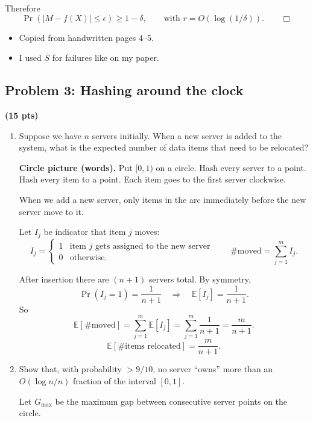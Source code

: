 \documentclass[10pt]{article}
\newcommand{\spara}[1]{\vspace{.5em}\noindent {\large\sffamily\textcolor{nyuOfficialPurple}{#1}}}
\newcommand{\E}{\mathbb{E}}
\begin{document}
Therefore
\[
\Pr(|M-f(X)|\le \epsilon)\ge 1-\delta,
\qquad
\text{with } r=O(\log(1/\delta)).
\qquad \Box
\]

\spara{Notes for Problem 2}
\begin{itemize}
\item Copied from handwritten pages 4--5.
\item I used $\bar{S}$ for failures like on my paper.
\end{itemize}



\subsection{Problem 3: Hashing around the clock}
\textbf{(15 pts)}

\begin{enumerate}[label=\arabic*.]

\item Suppose we have $n$ servers initially. When a new server is added to the system, what is the expected number of data items that need to be relocated?

\spara{Pr. 3.1}

\textbf{Circle picture (words).}
Put $[0,1)$ on a circle. Hash every server to a point. Hash every item to a point.
Each item goes to the first server clockwise.

When we add a new server, only items in the arc immediately before the new server move to it.

Let $I_j$ be indicator that item $j$ moves:
\[
I_j =
\begin{cases}
1 & \text{item $j$ gets assigned to the new server}\\
0 & \text{otherwise.}
\end{cases}
\qquad
\#\text{moved}=\sum_{j=1}^m I_j.
\]

After insertion there are $(n+1)$ servers total. By symmetry,
\[
\Pr(I_j=1)=\frac{1}{n+1}
\quad\Rightarrow\quad
\E[I_j]=\frac{1}{n+1}.
\]
So
\[
\E[\#\text{moved}] = \sum_{j=1}^m \E[I_j]=\sum_{j=1}^m \frac{1}{n+1}=\frac{m}{n+1}.
\]
\[
\boxed{\E[\#\text{items relocated}] = \frac{m}{n+1}.}
\]


\item Show that, with probability $> 9/10$, no server ``owns'' more than an $O(\log n / n)$ fraction of the interval $[0,1]$.

\spara{Pr. 3.2}

Let $G_{\max}$ be the maximum gap between consecutive server points on the circle.


\end{enumerate}
\end{document}
